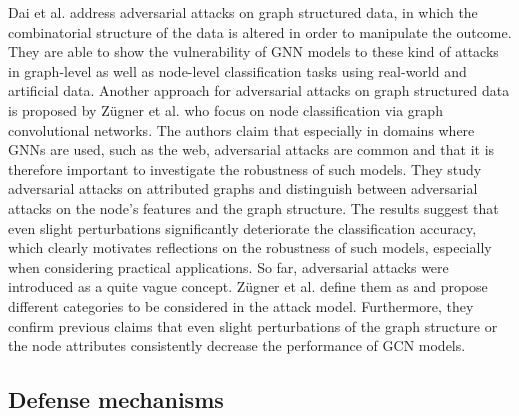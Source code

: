 \documentclass[a4paper,preprint]{sig-alternate}
\begin{document}
Dai et al. \cite{Dai_2018} address adversarial attacks on graph structured data, in which the combinatorial structure of 
the data is altered in order to manipulate the outcome. They are able to show the vulnerability of GNN models to these kind of attacks
in graph-level as well as node-level classification tasks using real-world and artificial data.\newline
Another approach for adversarial attacks on graph structured data is proposed by Zügner et al. \cite{Zuegner_2018} who focus on node classification
via graph convolutional networks. The authors claim that especially in domains where GNNs are used, such as the web, adversarial attacks are 
common and that it is therefore important to investigate the robustness of such models. They study adversarial attacks on attributed graphs 
and distinguish between adversarial attacks on the node's features and the graph structure.
The results suggest that even slight perturbations significantly deteriorate the classification accuracy, which clearly motivates reflections
on the robustness of such models, especially when considering practical applications.\newline
So far, adversarial attacks were introduced as a quite vague concept. Zügner et al. \cite{zuegner2019adversarial}
define them as 
and propose different categories to be considered in the attack model. Furthermore, they confirm previous claims that 
even slight perturbations of the graph structure or the node attributes consistently decrease the performance of GCN models.

\subsection{Defense mechanisms}
\label{sec:rev2}
\end{document}
